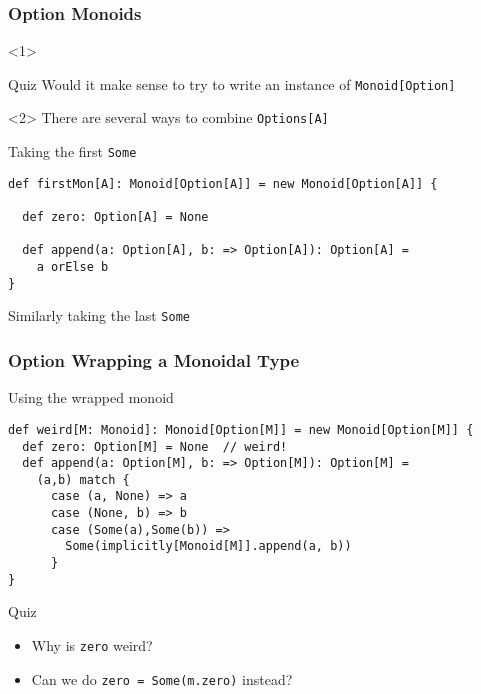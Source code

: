 \documentclass{beamer}
\begin{document}
\begin{frame}[fragile]
  \frametitle{Option Monoids}
  \begin{onlyenv}<1>
  \begin{block}{Quiz}
    Would it make sense to try to write an instance of
    \texttt{Monoid[Option]}
  \end{block}
  \end{onlyenv}

  \begin{onlyenv}<2>
    There are several ways to combine \texttt{Options[A]}

  \begin{block}{Taking the first \texttt{Some}}
  \begin{lstlisting}
def firstMon[A]: Monoid[Option[A]] = new Monoid[Option[A]] {

  def zero: Option[A] = None

  def append(a: Option[A], b: => Option[A]): Option[A] =
    a orElse b
}
  \end{lstlisting}
  \end{block}

  Similarly taking the last \texttt{Some}
  \end{onlyenv}

\end{frame}


\begin{frame}[fragile]
  \frametitle{Option Wrapping a Monoidal Type}
  \begin{block}{Using the wrapped monoid}
  \begin{lstlisting}
def weird[M: Monoid]: Monoid[Option[M]] = new Monoid[Option[M]] {
  def zero: Option[M] = None  // weird!
  def append(a: Option[M], b: => Option[M]): Option[M] =
    (a,b) match {
      case (a, None) => a
      case (None, b) => b
      case (Some(a),Some(b)) =>
        Some(implicitly[Monoid[M]].append(a, b))
      }
}
  \end{lstlisting}
  \end{block}

  \begin{block}{Quiz}
    \begin{itemize}
      \item Why is \texttt{zero} weird?
      \item Can we do \texttt{zero = Some(m.zero)} instead?
    \end{itemize}
  \end{block}
\end{frame}
\end{document}
